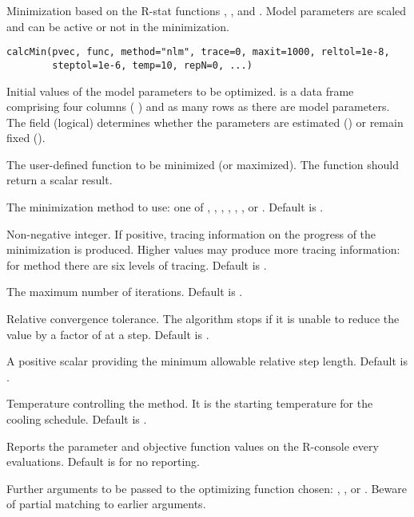\documentclass[letterpaper]{book}
\begin{document}
\begin{Description}\relax
Minimization based on the R-stat functions , , and .
Model parameters are scaled and can be active or not in the minimization.
\end{Description}
\begin{Usage}
\begin{verbatim}
calcMin(pvec, func, method="nlm", trace=0, maxit=1000, reltol=1e-8,
        steptol=1e-6, temp=10, repN=0, ...)
\end{verbatim}
\end{Usage}
\begin{Arguments}
\begin{ldescription}
\item[\code{pvec}] Initial values of the model parameters to be optimized.
 is a data frame comprising four columns (
) and as many rows as there are model
parameters. The  field (logical) determines whether the 
parameters are estimated () or remain fixed ().
\item[\code{func}] The user-defined function to be minimized (or maximized).
The function should return a scalar result.
\item[\code{method}] The minimization method to use: one of , ,
, , , , or 
. Default is .
\item[\code{trace}] Non-negative integer. If positive, tracing information on the
progress of the minimization is produced. Higher values may produce more
tracing information: for method  there are six levels of
tracing. Default is .
\item[\code{maxit}] The maximum number of iterations. Default is .
\item[\code{reltol}] Relative convergence tolerance. The algorithm stops if it is
unable to reduce the value by a factor of 
at a step. Default is .
\item[\code{steptol}] A positive scalar providing the minimum allowable relative step length.
Default is .
\item[\code{temp}] Temperature controlling the  method. It is the
starting temperature for the cooling schedule. Default is .
\item[\code{repN}] Reports the parameter and objective function values on the R-console
every  evaluations. Default is  for no reporting.
\item[\code{...}] Further arguments to be passed to the optimizing function chosen:
, , or .
Beware of partial matching to earlier arguments.
\end{ldescription}
\end{Arguments}
\end{document}
